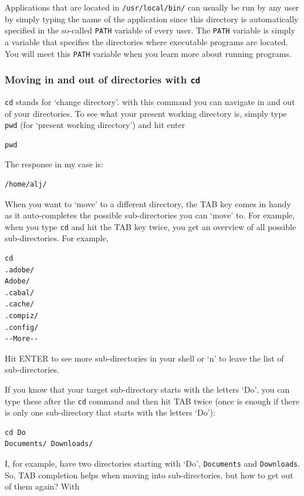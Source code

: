 \documentclass[11pt]{article}
\begin{document}
Applications that are located in \texttt{/usr/local/bin/} can usually be run by any
user by simply typing the name of the application since this directory is automatically specified in the so-called
\texttt{PATH} variable of every user. The \texttt{PATH} variable is simply a
variable that specifies the directories where executable programs are
located. You will meet this \texttt{PATH} variable when you learn more about
running programs.
\subsubsection{Moving in and out of directories with \texttt{cd}}
\label{sec-2-1-2}

 \texttt{cd} stands for `change directory'. with this command you can navigate
 in and out of your directories. To see what your present working
 directory is, simply type \texttt{pwd} (for `present working directory') and
 hit enter


\begin{verbatim}
pwd
\end{verbatim}

 The response in my case is:


\begin{verbatim}
/home/alj/
\end{verbatim}

 When you want to `move' to a different directory, the TAB key comes in
 handy as it auto-completes the possible sub-directories you can `move'
 to. For example, when you type \texttt{cd} and hit the TAB key twice, you get an
 overview of all possible sub-directories. For example,


\begin{verbatim}
cd 
.adobe/
Adobe/
.cabal/
.cache/
.compiz/
.config/
--More--
\end{verbatim}

 Hit ENTER to see more sub-directories in your shell or `n' to leave the
 list of sub-directories.

 If you know that your target sub-directory starts with the letters
 `Do', you can type these after the \texttt{cd} command and then hit TAB twice
 (once is enough if there is only one sub-directory that starts with the
 letters `Do'):


\begin{verbatim}
cd Do
Documents/ Downloads/
\end{verbatim}

 I, for example, have two directories starting with `Do', \texttt{Documents}
 and \texttt{Downloads}. So, TAB completion helps when moving into
 sub-directories, but how to get out of them again? With
\end{document}

